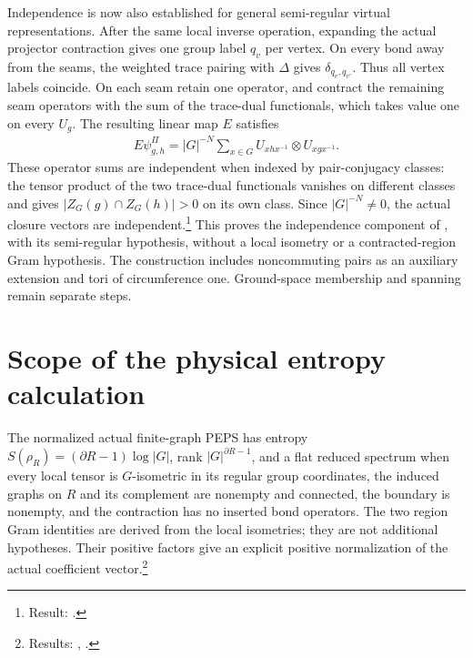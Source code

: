 \documentclass{article}
\begin{document}
Independence is now also established for general semi-regular virtual
representations. After the same local inverse operation, expanding the
actual projector contraction gives one group label $q_v$ per vertex.
On every bond away from the seams, the weighted trace pairing with
$\Delta$ gives $\delta_{q_v,q_{v'}}$. Thus all vertex labels coincide.
On each seam retain one operator, and contract the remaining seam
operators with the sum of the trace-dual functionals, which takes value
one on every $U_g$. The resulting linear map $E$ satisfies
\begin{align}
 E\psi^\Pi_{g,h}=|G|^{-N}
   \sum_{x\in G}U_{xhx^{-1}}\otimes U_{xgx^{-1}}.
    \label{eq:rmp_peps_qd_closure_extraction}
\end{align}
These operator sums are independent when indexed by pair-conjugacy
classes: the tensor product of the two trace-dual functionals vanishes
on different classes and gives $|Z_G(g)\cap Z_G(h)|>0$ on its own class.
Since $|G|^{-N}\ne0$, the actual closure vectors are
independent.\footnote{Result:
    .}
This proves the independence component of
\cite[Theorem~5.9]{Schuch2010PEPS}, with its semi-regular hypothesis,
without a local isometry or a contracted-region Gram hypothesis.
The construction includes noncommuting pairs as an auxiliary extension
and tori of circumference one. Ground-space membership and spanning
remain separate steps.

\section{Scope of the physical entropy calculation}
The normalized actual finite-graph PEPS has entropy
$S(\rho_R)=(\partial R-1)\log|G|$, rank $|G|^{\partial R-1}$,
and a flat reduced spectrum when every local tensor is
$G$-isometric in its regular group coordinates, the induced graphs on
$R$ and its complement are nonempty and connected, the boundary is
nonempty, and the contraction has no inserted bond operators.
The two region Gram identities are derived from the local isometries;
they are not additional hypotheses. Their positive factors give an
explicit positive normalization of the actual coefficient
vector.\footnote{Results:
    ,
    .}
\end{document}
